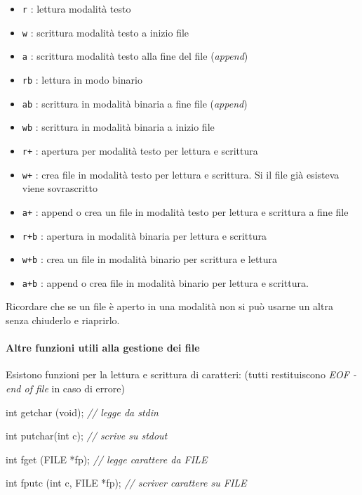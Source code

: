 \documentclass[
]{article}
\newenvironment{Shaded}{}{}
\newcommand{\CommentTok}[1]{\textcolor[rgb]{0.38,0.63,0.69}{\textit{#1}}}
\newcommand{\DataTypeTok}[1]{\textcolor[rgb]{0.56,0.13,0.00}{#1}}
\newcommand{\NormalTok}[1]{#1}
\begin{document}
\begin{itemize}
\item
  \texttt{r} : lettura modalità testo
\item
  \texttt{w} : scrittura modalità testo a inizio file
\item
  \texttt{a} : scrittura modalità testo alla fine del file
  (\emph{append})
\item
  \texttt{rb} : lettura in modo binario
\item
  \texttt{ab} : scrittura in modalità binaria a fine file
  (\emph{append})
\item
  \texttt{wb} : scrittura in modalità binaria a inizio file
\item
  \texttt{r+} : apertura per modalità testo per lettura e scrittura
\item
  \texttt{w+} : crea file in modalità testo per lettura e scrittura. Si
  il file già esisteva viene sovrascritto
\item
  \texttt{a+} : append o crea un file in modalità testo per lettura e
  scrittura a fine file
\item
  \texttt{r+b} : apertura in modalità binaria per lettura e scrittura
\item
  \texttt{w+b} : crea un file in modalità binario per scrittura e
  lettura
\item
  \texttt{a+b} : append o crea file in modalità binario per lettura e
  scrittura.
\end{itemize}

Ricordare che se un file è aperto in una modalità non si può usarne un
altra senza chiuderlo e riaprirlo.

\hypertarget{header-n1012}{%
\paragraph{Altre funzioni utili alla gestione dei
file}\label{header-n1012}}

Esistono funzioni per la lettura e scrittura di caratteri: (tutti
restituiscono \emph{EOF - end of file} in caso di errore)

\begin{Shaded}
\begin{Highlighting}[]
\DataTypeTok{int}\NormalTok{ getchar (}\DataTypeTok{void}\NormalTok{); }\CommentTok{// legge da stdin}

\DataTypeTok{int}\NormalTok{ putchar(}\DataTypeTok{int}\NormalTok{ c); }\CommentTok{// scrive su stdout}

\DataTypeTok{int}\NormalTok{ fget (}\DataTypeTok{FILE}\NormalTok{ *fp); }\CommentTok{// legge carattere da FILE}
  
\DataTypeTok{int}\NormalTok{ fputc (}\DataTypeTok{int}\NormalTok{ c, }\DataTypeTok{FILE}\NormalTok{ *fp); }\CommentTok{// scriver carattere su FILE}
 
\end{Highlighting}
\end{Shaded}
\end{document}
